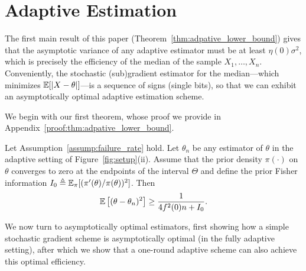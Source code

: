 \section{Adaptive Estimation \label{sec:sequential}}

The first main result of this paper (Theorem~\ref{thm:adpative_lower_bound})
gives that the asymptotic variance of any adaptive estimator must be at
least $\eta(0)\sigma^2$, which is precisely the efficiency of the median of
the sample $X_1,\ldots,X_n$. Conveniently, the stochastic (sub)gradient
estimator for the median---which minimizes $\mathbb{E}[|X - \theta|]$---is a
sequence of signs (single bits), so that we can exhibit an asymptotically
optimal adaptive estimation scheme.


We begin with our first theorem, whose proof we provide in
Appendix~\ref{proof:thm:adpative_lower_bound}.
\begin{thm}\label{thm:adpative_lower_bound}
  Let Assumption~\ref{assump:failure_rate} hold.
  Let ${\theta}_n$ be any estimator of $\theta$ in the adaptive setting of
  Figure~\ref{fig:setup}(ii). Assume that the prior
  density $\pi(\cdot)$ on $\theta$ converges to zero
  at the endpoints of the interval $\Theta$ and
  define the prior Fisher information
  $I_0 \triangleq \mathbb{E}_\pi[(\pi'(\theta) / \pi(\theta))^2]$.
  Then
  \begin{equation*}
    \mathbb{E}\left[ (\theta-{\theta}_n)^2 \right] \geq   \frac{1}{ 4f^2(0) n + I_0}.
  \end{equation*}
\end{thm}

We now turn to asymptotically optimal estimators, first
showing how a simple stochastic gradient scheme is asymptotically
optimal (in the fully adaptive setting), after which we show that
a one-round adaptive scheme can also achieve this optimal efficiency.

